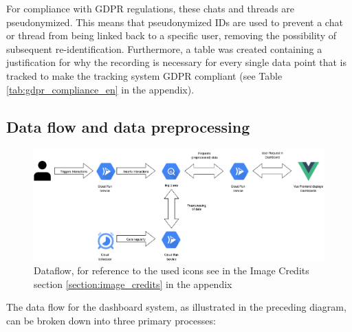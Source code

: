 \documentclass[
	english,
	ruledheaders=section,%
	class=report,%
	thesis={type=bachelor},%
	accentcolor=1b,%
	custommargins=true,%
	marginpar=false,%
	parskip=half-,%
	fontsize=11pt,%
	DIV=14,
]{tudapub}
\begin{document}
For compliance with GDPR \parencite{GDPR_2016} regulations, these chats and threads are pseudonymized. This means that pseudonymized IDs are used to prevent a chat or thread from being linked back to a specific user, removing the possibility of subsequent re-identification. Furthermore, a table was created containing a justification for why the recording is necessary for every single data point that is tracked to make the tracking system GDPR compliant (see Table \ref{tab:gdpr_compliance_en} in the appendix).
\newpage
\subsection{Data flow and data preprocessing}
\begin{figure}
    \centering
    \includegraphics[width=1\linewidth]{images/DataFlow_Bachelorthesis.drawio.png}
    \caption{Dataflow, for reference to the used icons see in the Image Credits section \ref{section:image_credits} in the appendix}
    \label{fig:enter-label}
\end{figure}

The data flow for the dashboard system, as illustrated in the preceding diagram, can be broken down into three primary processes:
\end{document}
